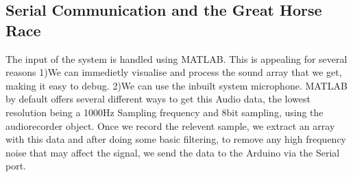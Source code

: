 \subsection{Serial Communication and the Great Horse Race}
The input of the system is handled using MATLAB. This is appealing for several reasons 
1)We can immedietly visualise and process the sound array that we get, making it easy to debug. 
2)We can use the inbuilt system microphone. 
MATLAB by default offers several different ways to get this Audio data, the lowest resolution being a 1000Hz Sampling frequency and 8bit sampling, using the audiorecorder object. Once we record the relevent sample, we extract an array with this data and after doing some basic filtering, to remove any high frequency noise that may affect the signal, we send the data to the Arduino via the Serial port. 

